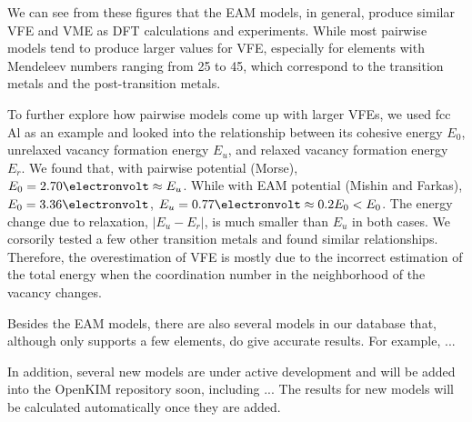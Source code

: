 \documentclass[%
 reprint,
 amsmath,amssymb,
 aps,
]{revtex4-1}
\begin{document}
We can see from these figures that the EAM models, in general, produce similar VFE and VME as DFT calculations and experiments.
While most pairwise models tend to produce larger values for VFE, especially for elements with Mendeleev numbers ranging from 25 to 45, which correspond to the transition metals and the post-transition metals.

To further explore how pairwise models come up with larger VFEs, we used fcc Al as an example and looked into the relationship between its cohesive energy $E_0$, unrelaxed vacancy formation energy $E_u$, and relaxed vacancy formation energy $E_r$.
We found that, with pairwise potential (Morse), $E_0 = 2.70\electronvolt \approx E_u$.
While with EAM potential (Mishin and Farkas), $E_0 = 3.36\electronvolt$, $E_u = 0.77\electronvolt \approx 0.2E_0 < E_0$.
The energy change due to relaxation, $|E_u-E_r|$, is much smaller than $E_u$ in both cases.
We corsorily tested a few other transition metals and found similar relationships.
Therefore, the overestimation of VFE is mostly due to the incorrect estimation of the total energy when the coordination number in the neighborhood of the vacancy changes.

Besides the EAM models, there are also several models in our database that, although only supports a few elements, do give accurate results.
For example, ...

In addition, several new models are under active development and will be added into the OpenKIM repository soon, including ...
The results for new models will be calculated automatically once they are added.
\end{document}
